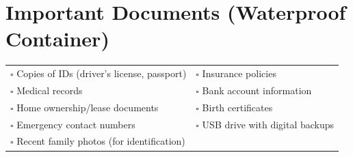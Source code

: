 
\section{Important Documents (Waterproof Container)}
\label{sec:document}

\begin{tabular}{p{9cm} p{9cm}}
$\square$ Copies of IDs (driver’s license, passport) & $\square$ Insurance policies \\ 
$\square$ Medical records & $\square$ Bank account information \\ 
$\square$ Home ownership/lease documents & $\square$ Birth certificates \\ 
$\square$ Emergency contact numbers & $\square$ USB drive with digital backups \\ 
$\square$ Recent family photos (for identification) & \\ 
\end{tabular}

